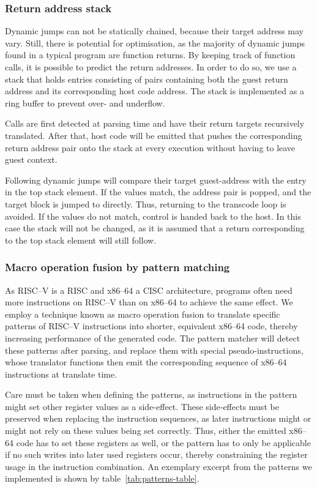 \subsubsection{Return address stack}
\label{sec:return-address-stack}
Dynamic jumps can not be statically chained, because their target address may vary.
Still, there is potential for optimisation, as the majority of dynamic jumps found in a typical program are function returns.
By keeping track of function calls, it is possible to predict the return addresses.
In order to do so, we use a stack that holds entries consisting of pairs containing both the guest return address and its corresponding host code address.
The stack is implemented as a ring buffer to prevent over- and underflow.

Calls are first detected at parsing time and have their return targets recursively translated.
After that, host code will be emitted that pushes the corresponding return address pair onto the stack at every execution without having to leave guest context.

Following dynamic jumps will compare their target guest-address with the entry in the top stack element.
If the values match, the address pair is popped, and the target block is jumped to directly.
Thus, returning to the transcode loop is avoided.
If the values do not match, control is handed back to the host.
In this case the stack will not be changed, as it is assumed that a return corresponding to the top stack element will still follow.


\subsubsection{Macro operation fusion by pattern matching}
\label{sec:pattern-matching}
As RISC--V is a RISC and x86--64 a CISC architecture, programs often need more instructions on RISC--V than on x86--64 to achieve the same effect.
We employ a technique known as macro operation fusion to translate specific patterns of RISC--V instructions into shorter, equivalent x86--64 code, thereby increasing performance of the generated code.
The pattern matcher will detect these patterns after parsing, and replace them with special pseudo-instructions, whose translator functions then emit the corresponding sequence of x86--64 instructions at translate time.

Care must be taken when defining the patterns, as instructions in the pattern might set other register values as a side-effect.
These side-effects must be preserved when replacing the instruction sequences, as later instructions might or might not rely on these values being set correctly.
Thus, either the emitted x86--64 code has to set these registers as well, or the pattern has to only be applicable if no such writes into later used registers occur, thereby constraining the register usage in the instruction combination.
An exemplary excerpt from the patterns we implemented is shown by table~\ref{tab:patterns-table}.

